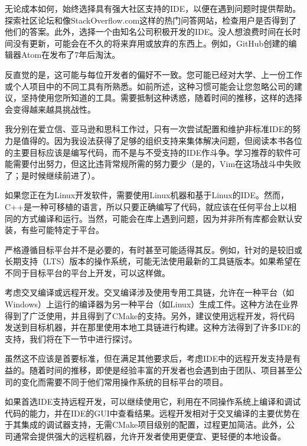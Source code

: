 无论成本如何，始终选择具有强大社区支持的IDE，以便在遇到问题时提供帮助。探索社区论坛和像StackOverflow.com这样的热门问答网站，检查用户是否得到了他们的答案。此外，选择一个由知名公司积极开发的IDE。没人想浪费时间在长时间没有更新，可能会在不久的将来弃用或放弃的东西上。例如，GitHub创建的编辑器Atom在发布了7年后淘汰。


反直觉的是，这可能与每位开发者的偏好不一致。您可能已经对大学、上一份工作或个人项目中的不同工具有所熟悉。如前所述，这种习惯可能会让您忽略公司的建议，坚持使用您所知道的工具。需要抵制这种诱惑，随着时间的推移，这样的选择会变得越来越具挑战性。

我分别在爱立信、亚马逊和思科工作过，只有一次尝试配置和维护非标准IDE的努力是值得的。因为我设法获得了足够的组织支持来集体解决问题，但阅读本书各位的主要目标应该是编写代码，而不是与不受支持的IDE作斗争。学习推荐的软件可能需要付出努力，但这比违背常规所需的努力要少（是的，Vim在这场战斗中失败了；是时候继续前进了）。


如果您正在为Linux开发软件，需要使用Linux机器和基于Linux的IDE。然而，C++是一种可移植的语言，所以只要正确编写了代码，就应该在任何平台上以相同的方式编译和运行。当然，可能会在库上遇到问题，因为并非所有库都会默认安装，有些可能特定于平台。

严格遵循目标平台并不是必要的，有时甚至可能适得其反。例如，针对的是较旧或长期支持（LTS）版本的操作系统，可能无法使用最新的工具链版本。如果希望在不同于目标平台的平台上开发，可以这样做。

考虑交叉编译或远程开发。交叉编译涉及使用专用工具链，允许在一种平台（如Windows）上运行的编译器为另一种平台（如Linux）生成工件。这种方法在业界得到了广泛使用，并且得到了CMake的支持。另外，建议使用远程开发，将代码发送到目标机器，并在那里使用本地工具链进行构建。这种方法得到了许多IDE的支持，我们将在下一节中进行探讨。


虽然这不应该是首要标准，但在满足其他要求后，考虑IDE中的远程开发支持是有益的。随着时间的推移，即使是经验丰富的开发者也会遇到由于团队、项目甚至公司的变化而需要不同于他们常用操作系统的目标平台的项目。

如果首选IDE支持远程开发，可以继续使用它，利用在不同操作系统上编译和调试代码的能力，并在IDE的GUI中查看结果。远程开发相对于交叉编译的主要优势在于其集成的调试器支持，无需CMake项目级别的配置，过程更加简洁。此外，公司通常会提供强大的远程机器，允许开发者使用更便宜、更轻便的本地设备。

